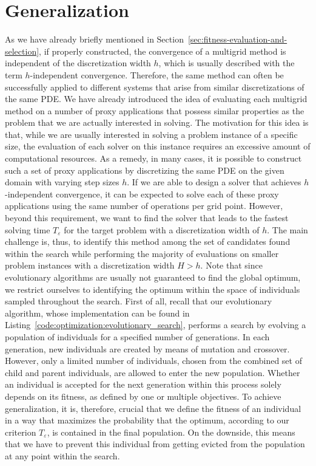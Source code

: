 \section{Generalization}
\label{sec:generalization}
As we have already briefly mentioned in Section~\ref{sec:fitness-evaluation-and-selection}, if properly constructed, the convergence of a multigrid method is independent of the discretization width $h$, which is usually described with the term $h$-independent convergence.
Therefore, the same method can often be successfully applied to different systems that arise from similar discretizations of the same PDE.
We have already introduced the idea of evaluating each multigrid method on a number of proxy applications that possess similar properties as the problem that we are actually interested in solving.
The motivation for this idea is that, while we are usually interested in solving a problem instance of a specific size, the evaluation of each solver on this instance requires an excessive amount of computational resources.
As a remedy, in many cases, it is possible to construct such a set of proxy applications by discretizing the same PDE on the given domain with varying step sizes $h$.
If we are able to design a solver that achieves $h$-independent convergence, it can be expected to solve each of these proxy applications using the same number of operations per grid point.
However, beyond this requirement, we want to find the solver that leads to the fastest solving time $T_\varepsilon$ for the target problem with a discretization width of $h$.
The main challenge is, thus, to identify this method among the set of candidates found within the search while performing the majority of evaluations on smaller problem instances with a discretization width $H > h$.
Note that since evolutionary algorithms are usually not guaranteed to find the global optimum, we restrict ourselves to identifying the optimum within the space of individuals sampled throughout the search.
First of all, recall that our evolutionary algorithm, whose implementation can be found in Listing~\ref{code:optimization:evolutionary_search}, performs a search by evolving a population of individuals for a specified number of generations.
In each generation, new individuals are created by means of mutation and crossover.
However, only a limited number of individuals, chosen from the combined set of child and parent individuals, are allowed to enter the new population.
Whether an individual is accepted for the next generation within this process solely depends on its fitness, as defined by one or multiple objectives.
To achieve generalization, it is, therefore, crucial that we define the fitness of an individual in a way that maximizes the probability that the optimum, according to our criterion $T_{\varepsilon}$, is contained in the final population.
On the downside, this means that we have to prevent this individual from getting evicted from the population at any point within the search.

